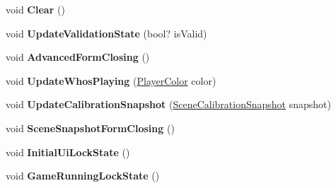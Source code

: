 \begin{DoxyCompactItemize}
void {\bfseries Clear} ()
\item 
\mbox{\label{class_chess_tracking_1_1_user_interface_1_1_main_game_form_a010c3e35db371c3d50a1cf4910d7136c}} 
void {\bfseries Update\+Validation\+State} (bool? is\+Valid)
\item 
\mbox{\label{class_chess_tracking_1_1_user_interface_1_1_main_game_form_a1aaf262cb1bc97ac13c1952034802be9}} 
void {\bfseries Advanced\+Form\+Closing} ()
\item 
\mbox{\label{class_chess_tracking_1_1_user_interface_1_1_main_game_form_a62f91b45e6eb973e09506cfa57c37e56}} 
void {\bfseries Update\+Whos\+Playing} (\mbox{\hyperlink{namespace_chess_tracking_1_1_game_ab79070a55977a8c8326e9cdda7dcfa9a}{Player\+Color}} color)
\item 
\mbox{\label{class_chess_tracking_1_1_user_interface_1_1_main_game_form_a8d4d03a0a184a2279ce1b515bbf7197d}} 
void {\bfseries Update\+Calibration\+Snapshot} (\mbox{\hyperlink{class_chess_tracking_1_1_image_processing_1_1_pipeline_data_1_1_scene_calibration_snapshot}{Scene\+Calibration\+Snapshot}} snapshot)
\item 
\mbox{\label{class_chess_tracking_1_1_user_interface_1_1_main_game_form_a3a5f3046cfecfb58f10566d0afb27f25}} 
void {\bfseries Scene\+Snapshot\+Form\+Closing} ()
\item 
\mbox{\label{class_chess_tracking_1_1_user_interface_1_1_main_game_form_a118a26f7fbff18b117d2416d8583ec38}} 
void {\bfseries Initial\+Ui\+Lock\+State} ()
\item 
\mbox{\label{class_chess_tracking_1_1_user_interface_1_1_main_game_form_aacc77c1c6fe7f18a4ed56d63b73431c4}} 
void {\bfseries Game\+Running\+Lock\+State} ()
\item 
\mbox{\label{class_chess_tracking_1_1_user_interface_1_1_main_game_form_aa2da9c97addebae822cb27cd1e302f2d}} 

\end{DoxyCompactItemize}
